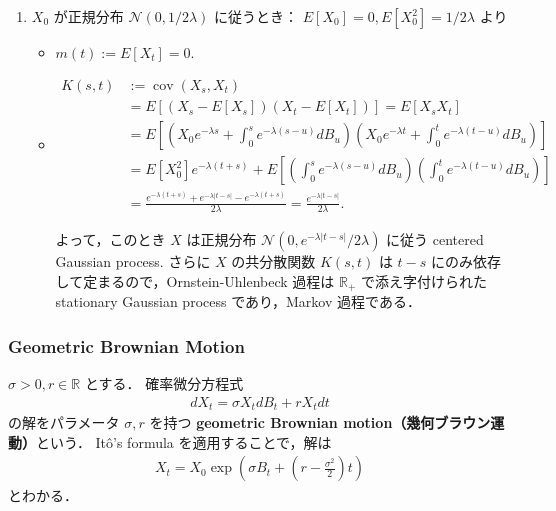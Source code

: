 \documentclass{jsarticle}
\begin{document}
\begin{enumerate}[label=(\roman*)]
    \item
    $X_{0}$ が正規分布 $\mathcal{N}(0, 1/2\lambda)$ に従うとき：
    $E[X_0]=0, E[X_0^2]=1/2\lambda$ より
    \begin{itemize}
        \item 
        $m(t):=E[X_t]=0.$
        \item 
        \begin{align}
            K(s, t)
            &:= \operatorname{cov}(X_{s}, X_{t}) \\
            &= E[(X_s-E[X_s])(X_t-E[X_t])]
            = E[X_s X_t] \\
            &= E[(X_0e^{-\lambda s}+\int_{0}^{s}e^{-\lambda(s-u)}dB_{u})
            (X_0e^{-\lambda t}+\int_{0}^{t}e^{-\lambda(t-u)}dB_{u})] \\
            &= E[X_0^2]e^{-\lambda(t+s)}
            + E[(\int_{0}^{s}e^{-\lambda(s-u)}dB_{u})(\int_{0}^{t}e^{-\lambda(t-u)}dB_{u})] \\
            &= \frac{e^{-\lambda(t+s)}+e^{-\lambda\lvert t-s\rvert}-e^{-\lambda(t+s)}}{2\lambda}
            = \frac{e^{-\lambda\lvert t-s\rvert}}{2\lambda}.
        \end{align}

        よって，このとき $X$ は正規分布 $\mathcal{N}(0, e^{-\lambda\lvert t-s\rvert}/2\lambda)$ に従う centered Gaussian process.
        さらに $X$ の共分散関数 $K(s, t)$ は $t-s$ にのみ依存して定まるので，Ornstein-Uhlenbeck 過程は $\mathbb{R}_+$ で添え字付けられた stationary Gaussian process であり，Markov 過程である．
    \end{itemize}
\end{enumerate}

\subsubsection{Geometric Brownian Motion}

$\sigma>0, r\in\mathbb{R}$ とする．
確率微分方程式
\begin{align}
    dX_t
    = \sigma X_t dB_t
    + rX_t dt
\end{align}
の解をパラメータ $\sigma, r$ を持つ \textbf{geometric Brownian motion（幾何ブラウン運動）}という．
It\^{o}'s formula を適用することで，解は
\begin{align}
    X_t
    = X_0\exp{(\sigma B_t+(r-\frac{\sigma^2}{2})t)}
\end{align}
とわかる．
\end{document}
